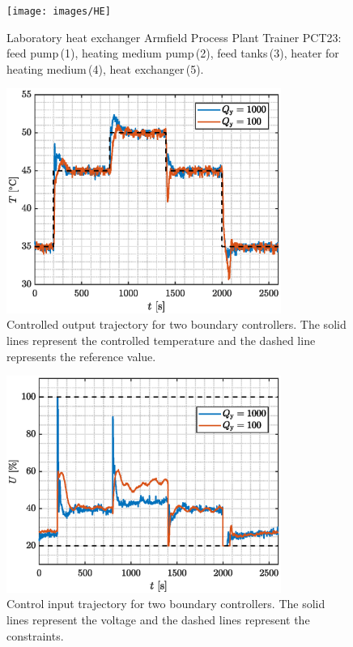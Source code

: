 \documentclass[preprint,12pt]{elsarticle}
\begin{document}
\begin{figure}
	\begin{center}
		\texttt{[image: images/HE]}
		\caption[Heat exchanger Armfield Process Plant Trainer PCT23]{Laboratory heat exchanger Armfield Process Plant Trainer PCT23: feed pump\,(1), heating medium pump\,(2), feed tanks\,(3), heater for heating medium\,(4), heat exchanger\,(5).}
		\label{fig:HE}
	\end{center}
\end{figure}

\begin{figure}
	\begin{center}
		\includegraphics[width=0.8\textwidth]{images/CV_boundaries}
		\caption{Controlled output trajectory for two boundary controllers. The solid lines represent the controlled temperature and the dashed line represents the reference value.}
		\label{fig:CV_boundaries}
	\end{center}
\end{figure}

\begin{figure}
	\begin{center}
		\includegraphics[width=0.8\textwidth]{images/MV_boundaries}
		\caption{Control input trajectory for two boundary controllers. The solid lines represent the voltage and the dashed lines represent the constraints.}
		\label{fig:MV_boundaries}
	\end{center}
\end{figure}
\end{document}
